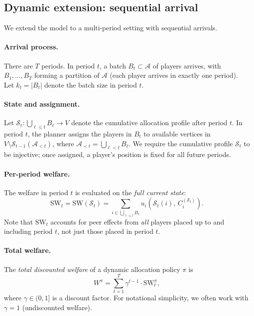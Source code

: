 \documentclass[11pt]{article}
\newcommand{\SW}{\mathrm{SW}}
\newcommand{\A}{\mathcal{A}}
\begin{document}
\subsection{Dynamic extension: sequential arrival}

We extend the model to a multi-period setting with sequential arrivals.

\paragraph{Arrival process.}
There are $T$ periods.
In period $t$, a batch $B_t \subset \A$ of players arrives, with $B_1, \ldots, B_T$
forming a partition of $\A$ (each player arrives in exactly one period).
Let $k_t = |B_t|$ denote the batch size in period $t$.

\paragraph{State and assignment.}
Let $\mathcal{S}_t : \bigcup_{\ell \leq t} B_\ell \to V$ denote the cumulative
allocation profile after period $t$.
In period $t$, the planner assigns the players in $B_t$ to available vertices in
$V \setminus \mathcal{S}_{t-1}(\A_{<t})$, where $\A_{<t} = \bigcup_{\ell < t} B_\ell$.
We require the cumulative profile $\mathcal{S}_t$ to be injective; once assigned, a
player's position is fixed for all future periods.

\paragraph{Per-period welfare.}
The welfare in period $t$ is evaluated on the \emph{full current state}:
\begin{equation}
  \SW_t = \SW(\mathcal{S}_t) = \sum_{i \in \bigcup_{\ell \leq t} B_\ell}
  u_i\!\left(\mathcal{S}_t(i),\, C_i^{(\mathcal{S}_t)}\right).
\end{equation}
Note that $\SW_t$ accounts for peer effects from \emph{all} players placed up to and
including period $t$, not just those placed in period $t$.

\paragraph{Total welfare.}
The \emph{total discounted welfare} of a dynamic allocation policy $\pi$ is
\begin{equation}
  W^\pi = \sum_{t=1}^T \gamma^{t-1} \cdot \SW_t^\pi,
\end{equation}
where $\gamma \in (0,1]$ is a discount factor.
For notational simplicity, we often work with $\gamma = 1$ (undiscounted welfare).
\end{document}
